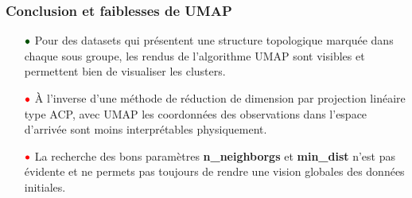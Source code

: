 \documentclass{beamer}
\theoremstyle{definition}
\begin{document}
\begin{frame}
	\frametitle{Conclusion et faiblesses de UMAP}
	\begin{itemize}
		
		\item[$\textcolor{modernvert}{\bullet}$] Pour des datasets qui présentent une structure topologique marquée dans chaque sous groupe, les rendus de l'algorithme UMAP sont visibles et permettent bien de visualiser les clusters.\\[1cm] 
		\item[$\textcolor{red}{\bullet}$] À l'inverse d'une méthode de réduction de dimension par projection linéaire type ACP, avec UMAP les coordonnées des observations dans l'espace d'arrivée sont moins interprétables physiquement. 
		\item[$\textcolor{red}{\bullet}$] La recherche des bons paramètres \textbf{n\_neighborgs} et \textbf{min\_dist} n'est pas  évidente et ne permets pas toujours de rendre une vision globales des données initiales.  
	\end{itemize}
	
\end{frame}
\end{document}
